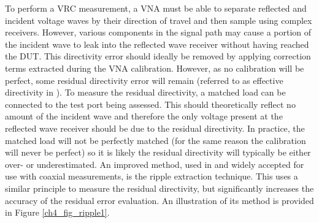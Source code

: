 \documentclass[../thesis/thesis.tex]{subfiles}
\begin{document}
\begin{refsection}
To perform a VRC measurement, a VNA must be able to separate reflected and incident voltage waves by their direction of travel and then sample using complex receivers. However, various components in the signal path may cause a portion of the incident wave to leak into the reflected wave receiver without having reached the DUT. This directivity error should ideally be removed by applying correction terms extracted during the VNA calibration. However, as no calibration will be perfect, some residual directivity error will remain (referred to as effective directivity in \cite{EURAMET_2011}). To measure the residual directivity, a matched load can be connected to the test port being assessed. This should theoretically reflect no amount of the incident wave and therefore the only voltage present at the reflected wave receiver should be due to the residual directivity. In practice, the matched load will not be perfectly matched (for the same reason the calibration will never be perfect) so it is likely the residual directivity will typically be either over- or underestimated. An improved method, used in \cite{EURAMET_2011} and widely accepted for use with coaxial measurements, is the ripple extraction technique. This uses a similar principle to measure the residual directivity, but significantly increases the accuracy of the residual error evaluation. An illustration of its method is provided in Figure \ref{ch4_fig_ripple1}.


\end{refsection}
\end{document}
